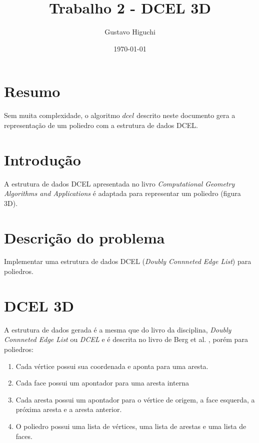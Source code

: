 \documentclass{article}
\title{Trabalho 2 - DCEL 3D}
\author{Gustavo Higuchi}
\date{\today}
\begin{document}
\maketitle
\newpage
\tableofcontents
\newpage
\section{Resumo}
\hspace*{15pt}Sem muita complexidade, o algoritmo $dcel$ descrito neste documento
gera a representação de um poliedro com a estrutura de dados DCEL.

\section{Introdução}
\hspace*{15pt}A estrutura de dados DCEL apresentada no livro
\textit{Computational Geometry Algorithms and Applications} \cite{bergBook} é
adaptada para representar um poliedro (figura 3D).

\section{Descrição do problema}
\hspace*{15pt}Implementar uma estrutura de dados DCEL (\textit{Doubly Connneted Edge List})
para poliedros.

\section{DCEL 3D}

\hspace*{15pt}A estrutura de dados gerada é a mesma que do livro da disciplina,
\textit{Doubly Connneted Edge List} ou \textit{DCEL} e é descrita no livro de
Berg et al. \cite{bergBook}, porém para poliedros:
\begin{enumerate}
    \item Cada vértice possui sua coordenada e aponta para uma aresta.
    \item Cada face possui um apontador para uma aresta interna
    \item Cada aresta possui um apontador para o vértice de origem, a face esquerda,
          a próxima aresta e a aresta anterior.
    \item O poliedro possui uma lista de vértices, uma lista de arestas e uma lista de
          faces.
\end{enumerate}
\end{document}
